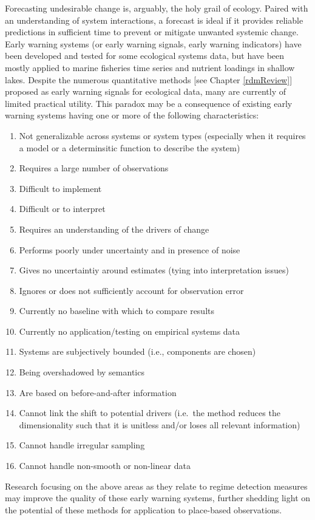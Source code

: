 \documentclass[print]{nuthesis}
\begin{document}
Forecasting undesirable change is, arguably, the holy grail of ecology. Paired with an understanding of system interactions, a forecast is ideal if it provides reliable predictions in sufficient time to prevent or mitigate unwanted systemic change. Early warning systems (or early warning signals, early warning indicators) have been developed and tested for some ecological systems data, but have been mostly applied to marine fisheries time series and nutrient loadings in shallow lakes. Despite the numerous quantitative methods {[}see Chapter \ref{rdmReview}{]} proposed as early warning signals for ecological data, many are currently of limited practical utility. This paradox may be a consequence of existing early warning systems having one or more of the following characteristics:
\begin{enumerate}
\def\labelenumi{\arabic{enumi}.}
\tightlist
\item
  Not generalizable across systems or system types (especially when it requires a model or a determinsitic function to describe the system)
\item
  Requires a large number of observations
\item
  Difficult to implement
\item
  Difficult or to interpret
\item
  Requires an understanding of the drivers of change
\item
  Performs poorly under uncertainty and in presence of noise
\item
  Gives no uncertaintiy around estimates (tying into interpretation issues)
\item
  Ignores or does not sufficiently account for observation error
\item
  Currently no baseline with which to compare results
\item
  Currently no application/testing on empirical systems data
\item
  Systems are subjectively bounded (i.e., components are chosen)
\item
  Being overshadowed by semantics
\item
  Are based on before-and-after information
\item
  Cannot link the shift to potential drivers (i.e.~the method reduces the dimensionality such that it is unitless and/or loses all relevant information)
\item
  Cannot handle irregular sampling
\item
  Cannot handle non-smooth or non-linear data
\end{enumerate}
Research focusing on the above areas as they relate to regime detection measures may improve the quality of these early warning systems, further shedding light on the potential of these methods for application to place-based observations.
\end{document}
